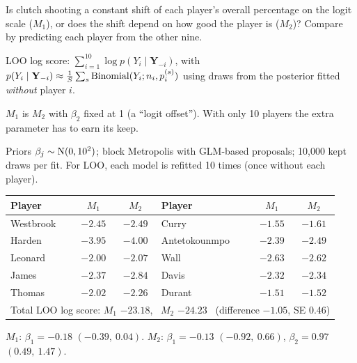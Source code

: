\documentclass[11pt]{article}
\begin{document}
\begin{restate}
Is clutch shooting a constant shift of each player's overall percentage on the logit scale ($M_1$), or does the shift depend on how good the player is ($M_2$)? Compare by predicting each player from the other nine.
\end{restate}

\begin{recall}
LOO log score: $\sum_{i=1}^{10}\log p(Y_i\mid\mathbf Y_{-i})$, with $p(Y_i\mid\mathbf Y_{-i})\approx\frac1S\sum_s\mathrm{Binomial}(Y_i;n_i,p_i^{(s)})$ using draws from the posterior fitted \emph{without} player $i$.
\end{recall}

\begin{keyidea}
$M_1$ is $M_2$ with $\beta_2$ fixed at 1 (a ``logit offset''). With only 10 players the extra parameter has to earn its keep.
\end{keyidea}

\solution
{} Priors $\beta_j\sim\mathrm{N}(0,10^2)$; block Metropolis with GLM-based proposals; 10{,}000 kept draws per fit. For LOO, each model is refitted 10 times (once without each player).
\begin{center}
\small
\begin{tabular}{lcc|lcc}\toprule
Player & $M_1$ & $M_2$ & Player & $M_1$ & $M_2$\\\midrule
Westbrook & $-2.45$ & $-2.49$ & Curry & $-1.55$ & $-1.61$\\
Harden & $-3.95$ & $-4.00$ & Antetokounmpo & $-2.39$ & $-2.49$\\
Leonard & $-2.00$ & $-2.07$ & Wall & $-2.63$ & $-2.62$\\
James & $-2.37$ & $-2.84$ & Davis & $-2.32$ & $-2.34$\\
Thomas & $-2.02$ & $-2.26$ & Durant & $-1.51$ & $-1.52$\\\midrule
\multicolumn{6}{c}{Total LOO log score: $M_1$ $\mathbf{-23.18}$, \ $M_2$ $-24.23$ \ (difference $-1.05$, SE 0.46)}\\\bottomrule
\end{tabular}
\end{center}
 $M_1$: $\beta_1=-0.18$ $(-0.39,\ 0.04)$. $M_2$: $\beta_1=-0.13$ $(-0.92,\ 0.66)$, $\beta_2=0.97$ $(0.49,\ 1.47)$.
\end{document}
